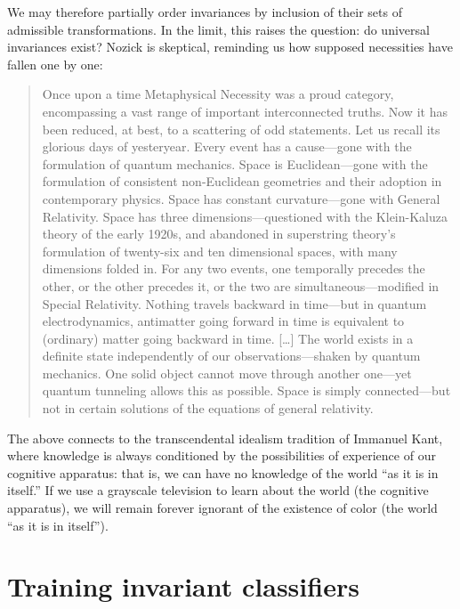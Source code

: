 We may therefore partially order invariances by inclusion of their sets of admissible transformations. In the limit, this raises the question: do universal invariances exist? Nozick is skeptical, reminding us how supposed necessities have fallen one by one:
\begin{quote}
Once upon a time Metaphysical Necessity was a proud category, encompassing a vast range of important interconnected truths. Now it has been reduced, at best, to a scattering of odd statements. Let us recall its glorious days of yesteryear. Every event has a cause---gone with the formulation of quantum mechanics. Space is Euclidean---gone with the formulation of consistent non-Euclidean geometries and their adoption in contemporary physics. Space has constant curvature---gone with General Relativity. Space has three dimensions---questioned with the Klein-Kaluza theory of the early 1920s, and abandoned in superstring theory's formulation of twenty-six and ten dimensional spaces, with many dimensions folded in. For any two events, one temporally precedes the other, or the other precedes it, or the two are simultaneous---modified in Special Relativity. Nothing travels backward in time---but in quantum electrodynamics, antimatter going forward in time is equivalent to (ordinary) matter going backward in time. [\ldots] The world exists in a definite state independently of our observations---shaken by quantum mechanics. One solid object cannot move through another one---yet quantum tunneling allows this as possible. Space is simply connected---but not in certain solutions of the equations of general relativity. \citep[p. 133]{nozick2001}
\end{quote}

The above connects to the transcendental idealism tradition of Immanuel Kant, where knowledge is always conditioned by the possibilities of experience of our cognitive apparatus: that is, we can have no knowledge of the world ``as it is in itself.'' If we use a grayscale television to learn about the world (the cognitive apparatus), we will remain forever ignorant of the existence of color (the world ``as it is in itself''). 

\section{Training invariant classifiers}\label{sec:classifiers}


